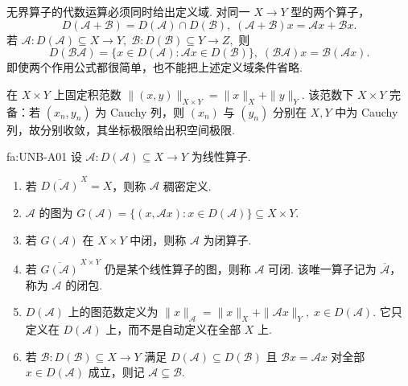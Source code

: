 无界算子的代数运算必须同时给出定义域. 对同一 \(\displaystyle X\to Y\) 型的两个算子，
\[
D(\mathcal A+\mathcal B)=D(\mathcal A)\cap D(\mathcal B),
\;
(\mathcal A+\mathcal B)x=\mathcal Ax+\mathcal Bx.
\]
若
\(\displaystyle \mathcal A:D(\mathcal A)\subseteq X\to Y, \; \mathcal B:D(\mathcal B)\subseteq Y\to Z,\)
则
\[
D(\mathcal B\mathcal A)
=
\{x\in D(\mathcal A):\mathcal Ax\in D(\mathcal B)\},
\;
(\mathcal B\mathcal A)x=\mathcal B(\mathcal Ax).
\]
即使两个作用公式都很简单，也不能把上述定义域条件省略.

在 \(\displaystyle X\times Y\) 上固定积范数
\(\displaystyle \|(x,y)\|_{X\times Y}=\|x\|_X+\|y\|_Y.\)
该范数下 \(\displaystyle X\times Y\) 完备：若 \(\displaystyle(x_n,y_n)\) 为 Cauchy 列，则 \(\displaystyle(x_n)\) 与 \(\displaystyle(y_n)\) 分别在 \(\displaystyle X,Y\) 中为 Cauchy 列，故分别收敛，其坐标极限给出积空间极限.

\begin{FADefinition}{fa:UNB-A01}
设 \(\displaystyle\mathcal A:D(\mathcal A)\subseteq X\to Y\) 为线性算子.
\begin{enumerate}[label=\textnormal{(\roman*)}]
\item 若 \(\displaystyle\overline{D(\mathcal A)}^{\,X}=X\)，则称 \(\displaystyle\mathcal A\) 稠密定义.
\item \(\displaystyle\mathcal A\) 的图为
\(\displaystyle G(\mathcal A)=\{(x,\mathcal Ax):x\in D(\mathcal A)\}\subseteq X\times Y.\)
\item 若 \(\displaystyle G(\mathcal A)\) 在 \(\displaystyle X\times Y\) 中闭，则称 \(\displaystyle\mathcal A\) 为闭算子.
\item 若 \(\displaystyle\overline{G(\mathcal A)}^{\,X\times Y}\) 仍是某个线性算子的图，则称 \(\displaystyle\mathcal A\) 可闭. 该唯一算子记为 \(\displaystyle\overline{\mathcal A}\)，称为 \(\displaystyle\mathcal A\) 的闭包.
\item \(\displaystyle D(\mathcal A)\) 上的图范数定义为
\(\displaystyle \|x\|_{\mathcal A}=\|x\|_X+\|\mathcal Ax\|_Y, \; x\in D(\mathcal A).\)
它只定义在 \(\displaystyle D(\mathcal A)\) 上，而不是自动定义在全部 \(\displaystyle X\) 上.
\item 若 \(\displaystyle\mathcal B:D(\mathcal B)\subseteq X\to Y\) 满足 \(\displaystyle D(\mathcal A)\subseteq D(\mathcal B)\) 且 \(\displaystyle\mathcal Bx=\mathcal Ax\) 对全部 \(\displaystyle x\in D(\mathcal A)\) 成立，则记 \(\displaystyle\mathcal A\subseteq\mathcal B\).
\end{enumerate}
\end{FADefinition}

